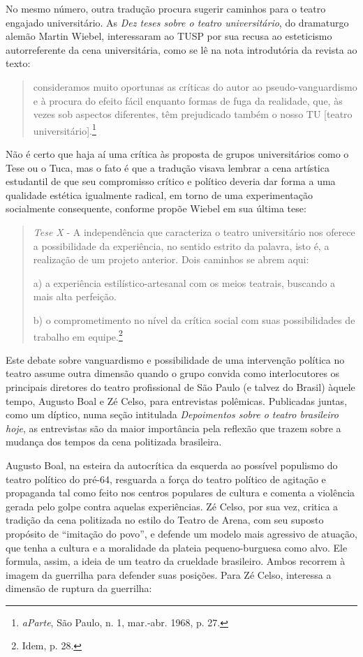No mesmo número, outra tradução procura sugerir caminhos para o teatro
engajado universitário. As \textit{Dez teses sobre o teatro universitário},
do dramaturgo alemão Martin Wiebel, interessaram ao TUSP por sua recusa
ao esteticismo autorreferente da cena universitária, como se lê na nota
introdutória da revista ao texto:

\begin{quote}
consideramos muito oportunas as críticas do autor ao pseudo-vanguardismo
e à procura do efeito fácil enquanto formas de fuga da realidade, que,
às vezes sob aspectos diferentes, têm prejudicado também o nosso TU
{[}teatro universitário{]}.\footnote{\textit{aParte}, São Paulo, n. 1,
  mar.-abr. 1968, p. 27.}
\end{quote}

Não é certo que haja aí uma crítica às proposta de grupos universitários
como o Tese ou o Tuca, mas o fato é que a tradução visava lembrar a cena
artística estudantil de que seu compromisso crítico e político deveria
dar forma a uma qualidade estética igualmente radical, em torno de uma
experimentação socialmente consequente, conforme propõe Wiebel em sua
última tese:

\begin{quote}
\textit{Tese X} - A independência que caracteriza o teatro universitário
nos oferece a possibilidade da experiência, no sentido estrito da
palavra, isto é, a realização de um projeto anterior. Dois caminhos se
abrem aqui:

a) a experiência estilístico-artesanal com os meios teatrais, buscando a
mais alta perfeição.

b) o comprometimento no nível da crítica social com suas possibilidades
de trabalho em equipe.\footnote{Idem, p. 28.}
\end{quote}

Este debate sobre vanguardismo e possibilidade de uma intervenção
política no teatro assume outra dimensão quando o grupo convida como
interlocutores os principais diretores do teatro profissional de São
Paulo (e talvez do Brasil) àquele tempo, Augusto Boal e Zé Celso, para
entrevistas polêmicas. Publicadas juntas, como um díptico, numa seção
intitulada \textit{Depoimentos sobre o teatro brasileiro hoje}, as
entrevistas são da maior importância pela reflexão que trazem sobre a
mudança dos tempos da cena politizada brasileira.

Augusto Boal, na esteira da autocrítica da esquerda ao possível
populismo do teatro político do pré-64, resguarda a força do teatro
político de agitação e propaganda tal como feito nos centros populares
de cultura e comenta a violência gerada pelo golpe contra aquelas
experiências. Zé Celso, por sua vez, critica a tradição da cena
politizada no estilo do Teatro de Arena, com seu suposto propósito de
“imitação do povo”, e defende um modelo mais agressivo de atuação, que
tenha a cultura e a moralidade da plateia pequeno-burguesa como alvo.
Ele formula, assim, a ideia de um teatro da crueldade brasileiro. Ambos
recorrem à imagem da guerrilha para defender suas posições. Para Zé
Celso, interessa a dimensão de ruptura da guerrilha:

